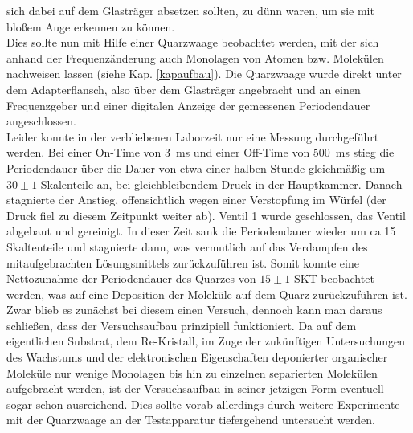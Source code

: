 sich dabei auf dem Glasträger absetzen sollten, zu dünn waren, um sie mit bloßem Auge
erkennen zu können.
\\
Dies sollte nun mit Hilfe einer Quarzwaage beobachtet werden, mit der sich anhand der
Frequenzänderung auch Monolagen von Atomen bzw. Molekülen nachweisen lassen (siehe Kap.
\ref{kapaufbau}). Die Quarzwaage wurde direkt unter dem Adapterflansch, also über dem Glasträger
angebracht und an einen Frequenzgeber und einer digitalen Anzeige der gemessenen Periodendauer
angeschlossen.
\\
Leider konnte in der verbliebenen Laborzeit nur eine Messung durchgeführt werden. Bei einer
On-Time von \SI{3}{ms} und einer Off-Time von \SI{500}{ms} stieg die Periodendauer über die Dauer
von etwa einer halben Stunde gleichmäßig um $30\pm1$ Skalenteile an, bei gleichbleibendem Druck in der
Hauptkammer. Danach stagnierte der Anstieg, offensichtlich wegen einer Verstopfung im Würfel (der
Druck fiel zu diesem Zeitpunkt weiter ab). Ventil 1 wurde geschlossen, das Ventil abgebaut und
gereinigt. In dieser Zeit sank die Periodendauer wieder um ca 15 Skaltenteile und stagnierte dann,
was vermutlich auf das Verdampfen des mitaufgebrachten Lösungsmittels zurückzuführen ist. Somit
konnte eine Nettozunahme der Periodendauer des Quarzes von $15\pm1$ SKT beobachtet werden, was auf
eine Deposition der Moleküle auf dem Quarz zurückzuführen ist.
\\
Zwar blieb es zunächst bei diesem einen Versuch, dennoch kann man daraus schließen, dass der
Versuchsaufbau prinzipiell funktioniert. Da auf dem eigentlichen Substrat, dem Re-Kristall,
im Zuge der zukünftigen Untersuchungen des Wachstums und der elektronischen Eigenschaften
deponierter organischer Moleküle nur wenige Monolagen bis hin zu einzelnen separierten Molekülen
aufgebracht werden, ist der Versuchsaufbau in seiner jetzigen Form eventuell sogar schon
ausreichend.
Dies sollte vorab allerdings durch weitere Experimente mit der Quarzwaage an der Testapparatur
tiefergehend untersucht werden.

